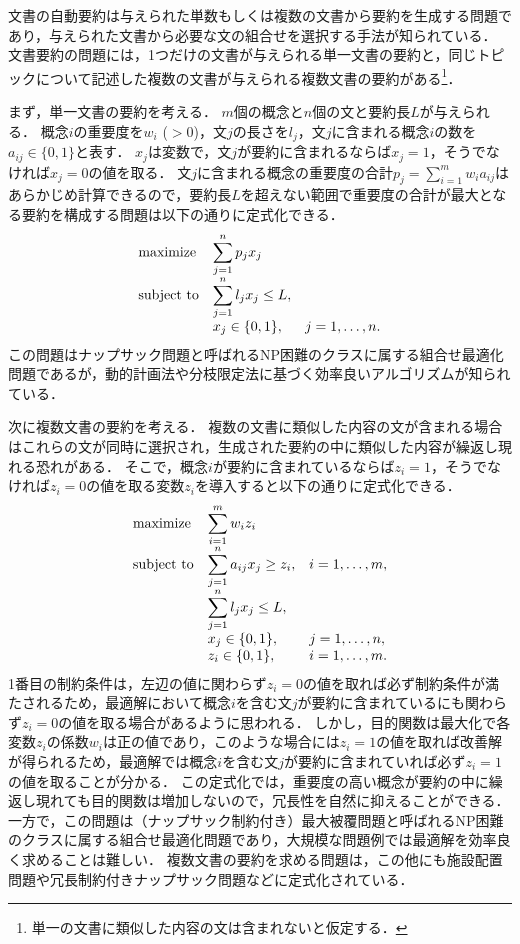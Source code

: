 \documentclass[japanese]{jnlp_1.4}
\begin{document}
文書の自動要約は与えられた単数もしくは複数の文書から要約を生成する問題であり，与えられた文書から必要な文の組合せを選択する手法が知られている．
文書要約の問題には，1つだけの文書が与えられる単一文書の要約と，同じトピックについて記述した複数の文書が与えられる複数文書の要約がある\footnote{単一の文書に類似した内容の文は含まれないと仮定する．}．

まず，単一文書の要約を考える．
$m$個の概念と$n$個の文と要約長$L$が与えられる．
概念$i$の重要度を$w_i$ ($> 0$)，文$j$の長さを$l_j$，文$j$に含まれる概念$i$の数を$a_{ij} \in \{ 0,1 \}$と表す．
$x_j$は変数で，文$j$が要約に含まれるならば$x_j=1$，そうでなければ$x_j=0$の値を取る．
文$j$に含まれる概念の重要度の合計$p_j = \sum_{i=1}^m w_i a_{ij}$はあらかじめ計算できるので，要約長$L$を超えない範囲で重要度の合計が最大となる要約を構成する問題は以下の通りに定式化できる．
\begin{equation}
\begin{array}{lll}
\textnormal{maximize} & \displaystyle\sum_{j=1}^n p_j x_j & \\
\textnormal{subject to} & \displaystyle\sum_{j=1}^n l_j x_j \le L,\\
& x_j \in \{ 0, 1 \}, & j=1,\dots,n.
\end{array}
\end{equation}
この問題はナップサック問題と呼ばれるNP困難のクラスに属する組合せ最適化問題であるが，動的計画法や分枝限定法に基づく効率良いアルゴリズムが知られている\cite{KellererH2004,KorteB2012}．

次に複数文書の要約を考える．
複数の文書に類似した内容の文が含まれる場合はこれらの文が同時に選択され，生成された要約の中に類似した内容が繰返し現れる恐れがある．
そこで，概念$i$が要約に含まれているならば$z_i=1$，そうでなければ$z_i=0$の値を取る変数$z_i$を導入すると以下の通りに定式化できる．
\begin{equation}
\begin{array}{lll}
\textnormal{maximize} & \displaystyle\sum_{i=1}^m w_i z_i & \\
\textnormal{subject to} & \displaystyle\sum_{j=1}^n a_{ij} x_j \ge z_i, & i=1,\dots,m,\\
& \displaystyle\sum_{j=1}^n l_j x_j \le L, \\
& x_j \in \{ 0, 1 \}, & j=1,\dots,n,\\
& z_i \in \{ 0, 1 \}, & i=1,\dots,m.
\end{array}
\end{equation}
1番目の制約条件は，左辺の値に関わらず$z_i=0$の値を取れば必ず制約条件が満たされるため，最適解において概念$i$を含む文$j$が要約に含まれているにも関わらず$z_i=0$の値を取る場合があるように思われる．
しかし，目的関数は最大化で各変数$z_i$の係数$w_i$は正の値であり，このような場合には$z_i=1$の値を取れば改善解が得られるため，最適解では概念$i$を含む文$j$が要約に含まれていれば必ず$z_i=1$の値を取ることが分かる．
この定式化では，重要度の高い概念が要約の中に繰返し現れても目的関数は増加しないので，冗長性を自然に抑えることができる．
一方で，この問題は（ナップサック制約付き）最大被覆問題と呼ばれるNP困難のクラスに属する組合せ最適化問題であり，大規模な問題例では最適解を効率良く求めることは難しい．
複数文書の要約を求める問題は，この他にも施設配置問題\cite{TakamuraH2010}や冗長制約付きナップサック問題\cite{NishikawaH2013}などに定式化されている．
\end{document}
